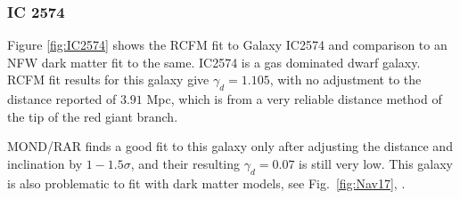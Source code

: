 \documentclass[reprint,%
 amsmath,amssymb,
 aps,
]{revtex4-1}
\begin{document}
\subsubsection{IC 2574}

Figure \ref{fig:IC2574} shows the RCFM fit to Galaxy IC2574 and comparison to an NFW dark matter fit to the same. IC2574 is  a gas dominated dwarf galaxy. RCFM fit results for this galaxy give  $\gamma_d = 1.105$, with no adjustment to the distance reported of  $3.91$ Mpc, which is from a very reliable distance method of    the tip of the red giant branch. 



MOND/RAR finds a good fit to this galaxy only  after adjusting
the  distance and inclination by $1-1.5 \sigma$, and their resulting 
$\gamma_d  = 0.07$ is still very low. This galaxy is also problematic to fit with dark matter models, see Fig.~\ref{fig:Nav17}, \cite{2017MNRAS.471.1841N}.  
 
\end{document}
